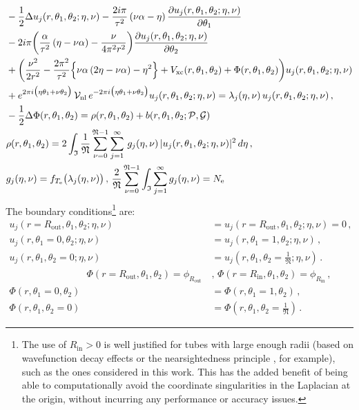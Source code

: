 \documentclass[preprint,12pt, 3p, sort&compress]{elsarticle}
\begin{document}
\begin{align}
\nonumber
&-\frac{1}{2}\Delta u_j(r,\theta_1,\theta_2;\eta,\nu) -\frac{2i\pi}{\tau^2}\left(\nu\alpha-\eta\right) \frac{\partial u_j(r,\theta_1,\theta_2;\eta,\nu)}{\partial\theta_1}\\\nonumber
&- 2i\pi\bigg(\frac{\alpha}{\tau^2}\left(\eta-\nu\alpha\right)-\frac{\nu}{4\pi^2 r^2}\bigg)\frac{\partial u_j(r,\theta_1,\theta_2;\eta,\nu)}{\partial\theta_2} \\\nonumber 
&+\bigg(\frac{\nu^2}{2r^2} - \frac{2\pi^2}{\tau^2}\Big\{\nu\alpha\left(2\eta-\nu\alpha\right)-\eta^2\Big\} + V_{\text{xc}}(r,\theta_1,\theta_2) + \Phi(r,\theta_1,\theta_2)\bigg) u_j(r,\theta_1,\theta_2;\eta,\nu)\\\label{eq:final_gov_eqn_1}
&+e^{2\pi i \big({\eta\theta_1 + {\nu}\theta_2 }\big)}\,{\cal V}_{\text{nl}}\,e^{-2\pi i \big({\eta\theta_1 + {\nu}\theta_2 }\big)}u_j(r,\theta_1,\theta_2;\eta,\nu) 
=\lambda_j(\eta,\nu)\,u_j(r,\theta_1,\theta_2;\eta,\nu)\,,\\\label{eq:final_gov_eqn_2}
&-\frac{1}{2}\Delta\Phi(r,\theta_1,\theta_2) = \rho(r,\theta_1,\theta_2) + b(r,\theta_1,\theta_2; {\cal P},{\cal G})\\\label{eq:final_gov_eqn_3}
&\rho(r,\theta_1,\theta_2) = 2\int_{\mathfrak{I}}\frac{1}{\mathfrak{N}}\sum_{\nu = 0}^{\mathfrak{N}-1}\sum_{j=1}^{\infty}\,g_j(\eta,\nu)\,\lvert u_j(r,\theta_1,\theta_2;\eta,\nu) \rvert^2\,d\eta\,,\\
&g_j(\eta,\nu) = f_{T_{\text{e}}}\big(\lambda_j(\eta, \nu)\big)\,,\,\frac{2}{\mathfrak{N}}\sum_{\nu = 0}^{\mathfrak{N}-1} \int_{\mathfrak{I}}\sum_{j=1}^{\infty} g_j(\eta, \nu) = N_{\text{e}}
\label{eq:final_gov_eqn_4}
\end{align}
The boundary conditions\footnote{{The use of $R_{\text{in}} > 0$ is well justified for tubes with large enough radii (based on wavefunction decay effects or the nearsightedness principle \citep{prodan2005nearsightedness}, for example), such as the ones considered in this work. This has the added benefit of being able to computationally avoid the coordinate singularities in the Laplacian at the origin, without incurring any performance or accuracy issues.}} are:
\begin{align}
\nonumber
u_j(r = R_{\text{out}},\theta_1,\theta_2;\eta,\nu) &= u_j(r = R_{\text{out}},\theta_1,\theta_2;\eta,\nu) = 0\,,\\\nonumber
u_j(r,\theta_1 = 0 ,\theta_2;\eta,\nu) &= u_j(r,\theta_1 = 1 ,\theta_2;\eta,\nu)\,,\\
u_j(r,\theta_1,\theta_2 = 0;\eta,\nu) &= u_j(r,\theta_1,\theta_2 = \frac{1}{\mathfrak{N}};\eta,\nu)\,.\\\nonumber
\quad\quad\quad\quad\quad\quad\quad\quad\Phi(r = R_{\text{out}},\theta_1,\theta_2) = \phi_{R_{\text{out}}}\,&,\,\Phi(r = R_{\text{in}},\theta_1,\theta_2) = \phi_{R_{\text{in}}}\,,\\\nonumber
\Phi(r,\theta_1 = 0 ,\theta_2) &= \Phi(r,\theta_1 = 1 ,\theta_2)\,,\\
\Phi(r,\theta_1,\theta_2 = 0) &= \Phi(r,\theta_1,\theta_2 = \frac{1}{\mathfrak{N}})\,.
\end{align}
\end{document}

